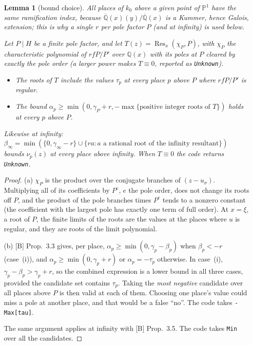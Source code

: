 \documentclass[11pt]{article}
\newtheorem{lemma}[theorem]{Lemma}
\theoremstyle{definition}
\theoremstyle{remark}
\newcommand{\Q}{\mathbb{Q}}
\newcommand{\Qbar}{\overline{\mathbb{Q}}}
\newcommand{\code}[1]{\texttt{#1}}
\begin{document}
\begin{lemma}[bound choice]\label{lem:E1choice}
All places of $k_0$ above a given point of $\mathbb P^1$ have the same ramification index,
because $\Qbar(x)(y)/\Qbar(x)$ is a Kummer, hence Galois, extension; this is why a single $r$
per pole factor $P$ (and at infinity) is used below.

\noindent Let $P\mid H$ be a finite pole factor, and let $T(z)=\operatorname{Res}_x(\chi_P,P)$, with
$\chi_P$ the characteristic polynomial of $rfP/P'$ over $\Q(x)$ with its poles at $P$ cleared
by exactly the pole order (a larger power makes $T\equiv0$, reported as \code{Unknown}).
\begin{itemize}
\item[(a)] The roots of $T$ include the values $\tau_p$ at every place $p$ above $P$ where
  $rfP/P'$ is regular.
\item[(b)] The bound $\alpha_p\ge\min(0,\gamma_P+r,-\max\{\text{positive integer roots of }T\})$
  holds at every $p$ above $P$.
\end{itemize}
Likewise at infinity: $\beta_\infty=\min(\{0,\gamma_\infty-r\}\cup\{ra: a\text{ a rational root of the
infinity resultant}\})$ bounds $\nu_p(z)$ at every place above infinity. When $T\equiv0$ the
code returns \code{Unknown}.
\end{lemma}
\begin{proof}
(a) $\chi_P$ is the product over the conjugate branches of $(z-u_\sigma)$. Multiplying all of
its coefficients by $P^e$, $e$ the pole order, does not change its roots off $P$, and the
product of the pole branches times $P^e$ tends to a nonzero constant (the coefficient with the
largest pole has exactly one term of full order). At $x=\xi$, a root of $P$, the
finite limits of the roots are the values at the places where $u$ is regular, and they are roots
of the limit polynomial.

(b) [B] Prop.~3.3 gives, per place, $\alpha_p\ge\min(0,\gamma_p-\beta_p)$ when
$\beta_p<-r$ (case~(i)), and $\alpha_p\ge\min(0,\gamma_p+r)$ or $\alpha_p=-\tau_p$ otherwise.
In case~(i), $\gamma_p-\beta_p>\gamma_p+r$, so the combined expression is a lower bound in all
three cases, provided the candidate set contains $\tau_p$. Taking the \emph{most negative}
candidate over all places above $P$ is then valid at each of them. Choosing one place's value
could miss a pole at another place, and that would be a false ``no''. The code takes
\code{-Max[tau]}.

The same argument applies at infinity with [B] Prop.~3.5. The code takes \code{Min} over all
the candidates.
\end{proof}
\end{document}
